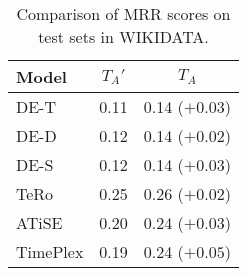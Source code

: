 \begin{table*}[htb]
\centering
\begin{minipage}{0.95\textwidth}
\centering
\caption{Comparison of MRR scores on test sets in WIKIDATA.}
\vspace{-3mm}

\begin{tabular}{l|cc}\hline
Model & $T_A'$ & $T_A$ \\ \hline
DE-T & 0.11 & 0.14 ($+0.03$) \\ 
DE-D & 0.12 & 0.14 ($+0.02$) \\ 
DE-S & 0.12 & 0.14 ($+0.03$) \\ 
TeRo & 0.25 & 0.26 ($+0.02$) \\ 
ATiSE & 0.20 & 0.24 ($+0.03$) \\ 
TimePlex & 0.19 & 0.24 ($+0.05$) \\ 
 \hline
\end{tabular}

\label{tab:relation_properties_wikidata12k_comparison}
\end{minipage}
\end{table*}


